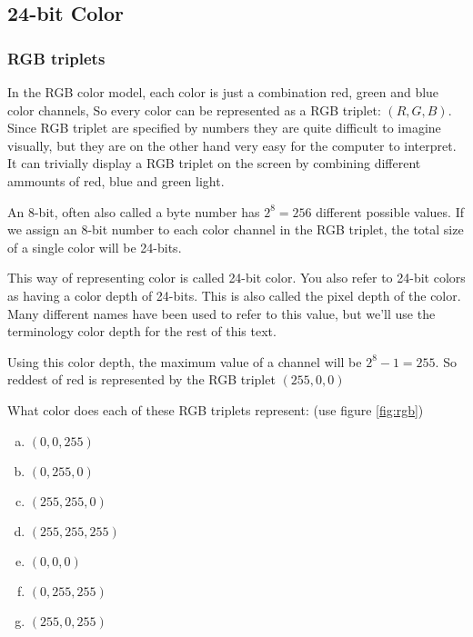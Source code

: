 \subsection{24-bit Color}
\label{sec:24-bit-color}

\subsubsection{RGB triplets}

In the RGB color model, each color is just a combination red, green
and blue color channels, So every color can be represented as a RGB
triplet: $(R, G, B)$. Since RGB triplet are specified by numbers they
are quite difficult to imagine visually, but they are on the other
hand very easy for the computer to interpret. It can trivially display
a RGB triplet on the screen by combining different ammounts of red,
blue and green light.

An 8-bit, often also called a byte number has $2^8 = 256$ different
possible values. If we assign an 8-bit number to each color channel in
the RGB triplet, the total size of a single color will be
24-bits.

This way of representing color is called 24-bit color. You also refer
to 24-bit colors as having a color depth of
24-bits. This is also called the pixel depth of the
color. Many different names have been used to refer to this value, but
we'll use the terminology color depth for the rest of this text.

Using this color depth, the maximum value of a channel will be $2^8 -
1 = 255$. So reddest of red is represented by the RGB triplet $(255,0,0)$

\begin{Exercise}[label={rgb-triplet}]
  What color does each of these RGB triplets represent: (use figure
  \ref{fig:rgb})

  \begin{enumerate}[(a)]
  \item $(0,0,255)$
  \item $(0, 255, 0)$
  \item $(255,255,0)$
  \item $(255,255,255)$
  \item $(0,0,0)$
  \item $(0,255,255)$
  \item $(255,0,255)$

  \end{enumerate}
\end{Exercise}

